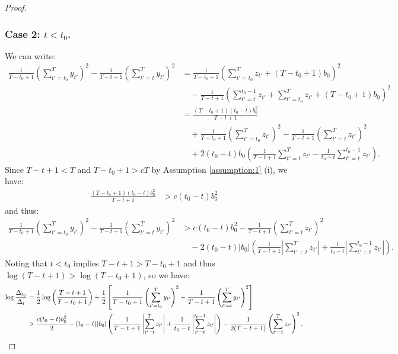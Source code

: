 \begin{proof}
\subsubsection*{Case 2: $t < t_0$.}

We can write:
\small
\begin{align*}
    \frac{1}{T-t_0+1}\left(\sum_{t'=t_0}^{T} y_{t'}\right)^2 - \frac{1}{T-t+1}\left(\sum_{t'=t}^{T} y_{t'}\right)^2 &= \frac{1}{T-t_0+1}\left(\sum_{t'=t_0}^{T} z_{t'} + (T-t_0+1)b_0\right)^2 \\
    &\quad - \frac{1}{T-t+1}\left(\sum_{t'=t}^{t_0-1} z_{t'} + \sum_{t'=t_0}^{T} z_{t'} + (T-t_0+1)b_0\right)^2 \\ 
    &= \frac{(T-t_0+1)(t_0 - t) b_0^2}{T-t+1} \\
    &\quad + \frac{1}{T-t_0+1}\left(\sum_{t'=t_0}^{T} z_{t'}\right)^2 -\frac{1}{T-t+1}\left(\sum_{t'=t}^{T} z_{t'}\right)^2\\
    &\quad  + 2(t_0 - t) b_0\left(\frac{1}{T-t+1}\sum_{t'=t}^{T} z_{t'} - \frac{1}{t_0-t}\sum_{t'=t}^{t_0-1} z_{t'}\right).
\end{align*}
\normalsize
Since $T-t+1 < T$ and $T - t_0 + 1 > cT$ by Assumption \ref{assumption:1} (i), we have:
\begin{align*}
    \frac{(T - t_0 + 1)(t_0-t)b_0^2}{T-t+1} &> c (t_0-t) b_0^2 
\end{align*}
and thus:
\begin{align*}
    \frac{1}{T-t_0+1}\left(\sum_{t'=t_0}^{T} y_{t'}\right)^2 - \frac{1}{T-t+1}\left(\sum_{t'=t}^{T} y_{t'}\right)^2 &> c(t_0 - t)b_0^2 -\frac{1}{T-t+1}\left(\sum_{t'=t}^{T} z_{t'}\right)^2\\
    &\quad  - 2(t_0 - t) |b_0|\left(\frac{1}{T-t+1}\left|\sum_{t'=t}^{T} z_{t'}\right| + \frac{1}{t_0-t}\left|\sum_{t'=t}^{t_0-1} z_{t'}\right|\right).
\end{align*}
Noting that $t < t_0$ implies $T - t + 1 > T - t_0 + 1$ and thus $ \log (T-t+1) > \log(T-t_0+1)$, so we have:
\small
\begin{align*}
    \log \frac{\Delta_{t_0}}{\Delta_t} &= \frac{1}{2} \log \left(\frac{T-t+1}{T-t_0+1}\right) + \frac{1}{2} \left[\frac{1}{T-t_0+1}\left(\sum_{t'=t_0}^{T} y_{t'}\right)^2- \frac{1}{T-t+1}\left(\sum_{t'=t}^{T} y_{t'}\right)^2\right] \notag \\
    &> \frac{c (t_0-t)b_0^2 }{2} - (t_0 -t) |b_0| \left(\frac{1}{T-t+1}\left|\sum_{t'=t}^{T} z_{t'}\right| + \frac{1}{t_0-t}\left|\sum_{t'=t}^{t_0-1} z_{t'}\right|\right) -\frac{1}{2(T-t+1)}\left(\sum_{t'=t}^{T} z_{t'}\right)^2.
\end{align*}

\end{proof}

